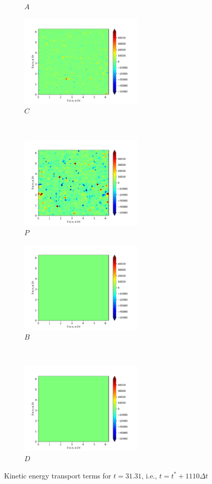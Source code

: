 \begin{figure}[H]
\begin{subfigure}{0.45\textwidth}
        \caption{$A$}
    \end{subfigure}
    \newline
    \begin{subfigure}{0.45\textwidth}
        \includegraphics[height=1.75in]{media/run-cds-65-25k/C-ke-449.png}
        \caption{$C$}
    \end{subfigure}
    ~
    \begin{subfigure}{0.45\textwidth}
        \includegraphics[height=1.75in]{media/run-cds-65-25k/P-ke-449.png}
        \caption{$P$}
    \end{subfigure}
    \newline
    \begin{subfigure}{0.45\textwidth}
        \includegraphics[height=1.75in]{media/run-cds-65-25k/B-ke-449.png}
        \caption{$B$}
    \end{subfigure}
    ~
    \begin{subfigure}{0.45\textwidth}
        \includegraphics[height=1.75in]{media/run-cds-65-25k/D-ke-449.png}
        \caption{$D$}
    \end{subfigure}
    \caption{Kinetic energy transport terms for $t=31.31$, i.e., $t=t^{\ast} + 1110 \Delta t$}
\end{figure}
